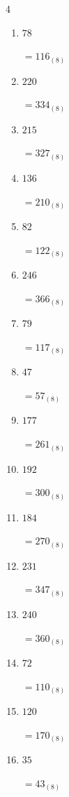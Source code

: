 \begin{multicols}{4}
\begin{enumerate}
  \item $78$

        $=116_{(8)}$

  \item $220$

        $=334_{(8)}$

  \item $215$

        $=327_{(8)}$

  \item $136$

        $=210_{(8)}$

  \item $82$

        $=122_{(8)}$

  \item $246$

        $=366_{(8)}$

  \item $79$

        $=117_{(8)}$

  \item $47$

        $=57_{(8)}$

  \item $177$

        $=261_{(8)}$

  \item $192$

        $=300_{(8)}$

  \item $184$

        $=270_{(8)}$

  \item $231$

        $=347_{(8)}$

  \item $240$

        $=360_{(8)}$

  \item $72$

        $=110_{(8)}$

  \item $120$

        $=170_{(8)}$

\columnbreak %

\resetques

  \item $35$

        $=43_{(8)}$


\end{enumerate}
\end{multicols}
